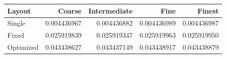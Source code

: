 \begin{tabular}{lrrrr}
\toprule
Layout & Coarse & Intermediate & Fine & Finest \\
\midrule
Single & 0.004436967 & 0.004436882 & 0.004436989 & 0.004436987 \\
Fixed & 0.025919839 & 0.025919347 & 0.025919963 & 0.025919950 \\
Optimized & 0.043438627 & 0.043437149 & 0.043438917 & 0.043438879 \\
\bottomrule
\end{tabular}
